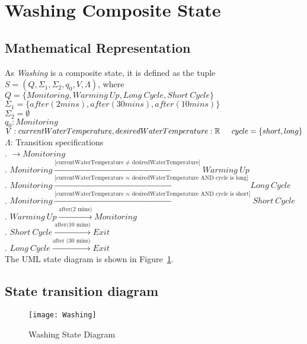 \newpage
\section{Washing Composite State}

\subsection{Mathematical Representation}

\noindent As \textit{Washing} is a composite state, it is defined as the tuple $S = (Q, \Sigma_1, \Sigma_2, q_0, V, \Lambda)$, where\\

\noindent $Q = \{Monitoring, Warming~Up, Long~Cycle, Short~Cycle\}$\\
\noindent $\Sigma_1 = \{after(2mins), after(30mins), after(10mins)\}$\\
\noindent $\Sigma_2 = \emptyset$\\
\noindent $q_0: Monitoring$\\
\noindent $V: currentWaterTemperature, desiredWaterTemperature: \mathbb{R} \\
\indent cycle = \{short, long\}$\\
\noindent $\Lambda$: Transition specifications\\
. $\rightarrow Monitoring$\\
. $Monitoring \xrightarrow {\text {[currentWaterTemperature $\neq$ desiredWaterTemperature]}} Warming~Up$\\
. $Monitoring \xrightarrow {\text {[currentWaterTemperature $\approx$ desiredWaterTemperature AND cycle is long]}} Long~Cycle$\\
. $Monitoring \xrightarrow {\text {[currentWaterTemperature $\approx$ desiredWaterTemperature AND cycle is short]}} Short~Cycle$\\
. $Warming~Up \xrightarrow {\text {after(2 mins)}} Monitoring$\\
. $Short~Cycle \xrightarrow {\text {after(10 mins)}} Exit$\\
. $Long~Cycle \xrightarrow {\text {after (30 mins)}} Exit$\\

\noindent The UML state diagram is shown in Figure~\ref{fig:Washing}.

\newpage

\subsection{State transition diagram}

\begin{figure}[h!]
	\centering
		\texttt{[image: Washing]}
		  \caption{Washing State Diagram}
  \label{fig:Washing}
\end{figure}
